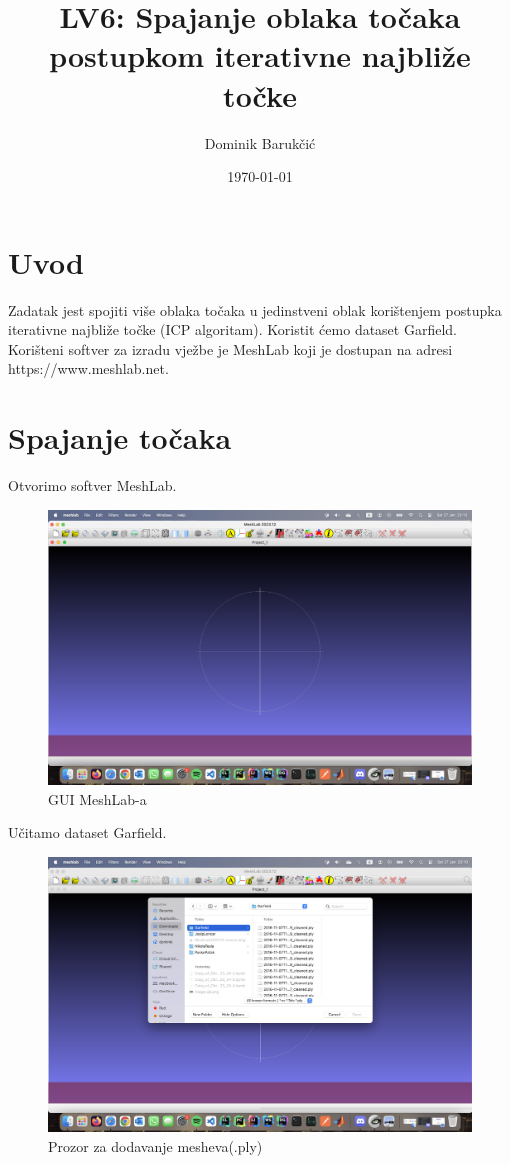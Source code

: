 \documentclass[12pt]{article} %
\title{LV6: Spajanje oblaka točaka postupkom iterativne najbliže točke}
\author{Dominik Barukčić}
\date{\today}
\begin{document}
	
	\maketitle
	
	\section{Uvod}
	Zadatak jest spojiti više oblaka točaka u jedinstveni
	oblak korištenjem postupka iterativne najbliže točke (ICP algoritam). Koristit ćemo dataset Garfield. Korišteni softver za izradu vježbe je MeshLab koji je dostupan na adresi https://www.meshlab.net.
	
	\section{Spajanje točaka}
	Otvorimo softver MeshLab. 
		\begin{figure}[H]
			\centering
			\includegraphics[width=1\textwidth]{screenshots/1.png}
			\caption{GUI MeshLab-a}
			\label{fig:yourlabel}
		\end{figure}
		
		Učitamo dataset Garfield.
		
		\begin{figure}[H]
			\centering
			\includegraphics[width=1\textwidth]{screenshots/2.png}
			\caption{Prozor za dodavanje mesheva(.ply)}
			\label{fig:yourlabel}
		\end{figure}
		
\end{document}
